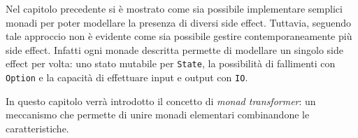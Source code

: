 Nel capitolo precedente si è mostrato come sia possibile implementare semplici monadi per poter modellare la presenza di diversi side effect.
Tuttavia, seguendo tale approccio non è evidente come sia possibile gestire contemporaneamente più side effect. Infatti ogni monade descritta permette di modellare un singolo side effect per volta: uno stato mutabile per \lstinline{State}, la possibilità di fallimenti con \lstinline{Option} e la capacità di effettuare input e output con \lstinline{IO}.

In questo capitolo verrà introdotto il concetto di \emph{monad transformer}: un meccanismo che permette di unire monadi elementari combinandone le caratteristiche.


